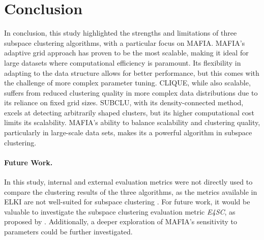 \section{Conclusion}
In conclusion, this study highlighted the strengths and limitations of three subspace clustering algorithms, with a particular focus on MAFIA. MAFIA's adaptive grid approach has proven to be the most scalable, making it ideal for large datasets where computational efficiency is paramount. Its flexibility in adapting to the data structure allows for better performance, but this comes with the challenge of more complex parameter tuning. CLIQUE, while also scalable, suffers from reduced clustering quality in more complex data distributions due to its reliance on fixed grid sizes. SUBCLU, with its density-connected method, excels at detecting arbitrarily shaped clusters, but its higher computational cost limits its scalability. MAFIA's ability to balance scalability and clustering quality, particularly in large-scale data sets, makes its a powerful algorithm in subspace clustering.

\paragraph{Future Work.}
In this study, internal and external evaluation metrics were not directly used to compare the clustering results of the three algorithms, as the metrics available in ELKI are not well-suited for subspace clustering \cite{e4sc}. For future work, it would be valuable to investigate the subspace clustering evaluation metric \textit{E4SC}, as proposed by \cite{e4sc}. Additionally, a deeper exploration of MAFIA's sensitivity to parameters could be further investigated.